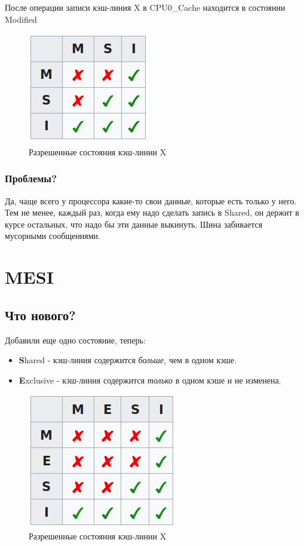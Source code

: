 \documentclass[12pt, a4paper]{article}
\begin{document}
После операции записи кэш-линия X в CPU0\_Cache находится в состоянии Modified\\
\begin{figure}[h]
    \centering
    \includegraphics[scale=0.7]{./images/MSI.png}
    \caption{Разрешенные состояния кэш-линии X}
    \label{fig:MSI}
\end{figure}
\subsubsection{Проблемы?}
Да, чаще всего у процессора какие-то свои данные, которые есть только у него. Тем не менее, каждый раз, когда ему надо сделать запись в Shared, он держит в курсе остальных, что надо бы эти данные выкинуть. Шина забивается мусорными сообщениями.
\section{MESI}
\subsection{Что нового?}
Добавили еще одно состояние, теперь:
\begin{itemize}
    \item \textbf{S}hared - кэш-линия содержится \textit{больше}, чем в одном кэше.
    \item \textbf{E}xclusive - кэш-линия содержится \textit{только} в одном кэше и не изменена.
\end{itemize}
\begin{figure}[h]
    \centering
    \includegraphics[scale=0.7]{./images/MESI.png}
    \caption{Разрешенные состояния кэш-линии X}
    \label{fig:MESI}
\end{figure}
\end{document}

